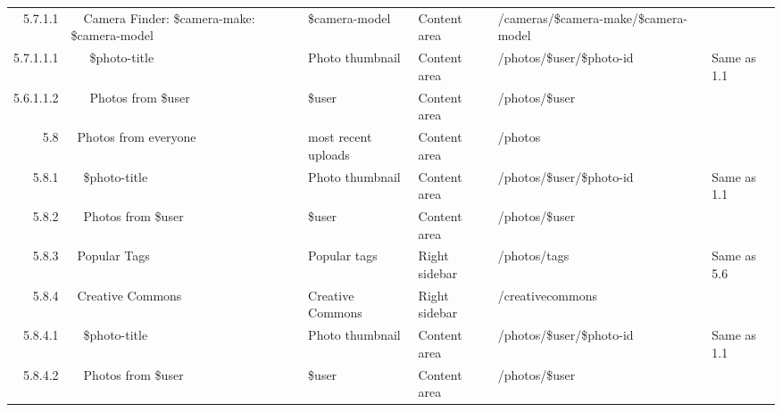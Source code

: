 \documentclass[12pt,a4paper]{article}
\begin{document}
\begin{landscape}
\begin{table}[h!b!p!]
\begin{center}
\begin{tiny}
\begin{tabular}{r|l|l|l|l|p{3cm}}
                  5.7.1.1 &
                  ~~Camera Finder: \$camera-make: \$camera-model &
                  \$camera-model &
                  Content area &
                  /cameras/\$camera-make/\$camera-model &
                  \\

                    5.7.1.1.1 &
                    ~~~\$photo-title &
                    Photo thumbnail &
                    Content area &
                    /photos/\$user/\$photo-id &
                    Same as 1.1 \\

                    5.6.1.1.2 &
                    ~~~Photos from \$user &
                    \$user &
                    Content area &
                    /photos/\$user &
                    \\

              5.8 &
              ~Photos from everyone &
              most recent uploads &
              Content area &
              /photos &
              \\

                  5.8.1 &
                  ~~\$photo-title &
                  Photo thumbnail &
                  Content area &
                  /photos/\$user/\$photo-id &
                  Same as 1.1 \\

                  5.8.2 &
                  ~~Photos from \$user &
                  \$user &
                  Content area &
                  /photos/\$user &
                  \\


                  5.8.3 &
                  ~Popular Tags &
                  Popular tags &
                  Right sidebar &
                  /photos/tags &
                  Same as 5.6 \\

                  5.8.4 &
                  ~Creative Commons &
                  Creative Commons &
                  Right sidebar &
                  /creativecommons &
                  \\

                    5.8.4.1 &
                    ~~\$photo-title &
                    Photo thumbnail &
                    Content area &
                    /photos/\$user/\$photo-id &
                    Same as 1.1 \\

                    5.8.4.2 &
                    ~~Photos from \$user &
                    \$user &
                    Content area &
                    /photos/\$user &
                    \\


\end{tabular}
\end{tiny}
\end{center}
\end{table}
\end{landscape}
\end{document}
